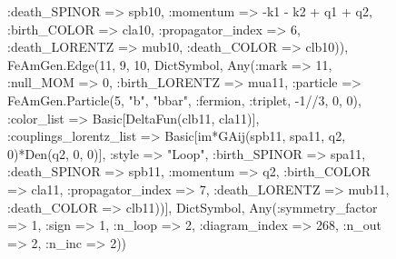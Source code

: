 \documentclass{revtex4}
\begin{document}
\begin{figure}[!htb]
\begin{center}
{:death_SPINOR => spb10, :momentum => -k1 - k2 + q1 + q2, :birth_COLOR => cla10, :propagator_index => 6, :death_LORENTZ => mub10, :death_COLOR => clb10)), FeAmGen.Edge(11, 9, 10, Dict{Symbol, Any}(:mark => 11, :null_MOM => 0, :birth_LORENTZ => mua11, :particle => FeAmGen.Particle(5, "b", "bbar", :fermion, :triplet, -1//3, 0, 0), :color_list => Basic[DeltaFun(clb11, cla11)], :couplings_lorentz_list => Basic[im*GAij(spb11, spa11, q2, 0)*Den(q2, 0, 0)], :style => "Loop", :birth_SPINOR => spa11, :death_SPINOR => spb11, :momentum => q2, :birth_COLOR => cla11, :propagator_index => 7, :death_LORENTZ => mub11, :death_COLOR => clb11))], Dict{Symbol, Any}(:symmetry_factor => 1, :sign => 1, :n_loop => 2, :diagram_index => 268, :n_out => 2, :n_inc => 2)) 
}
\end{center}
\end{figure}
\end{document}
